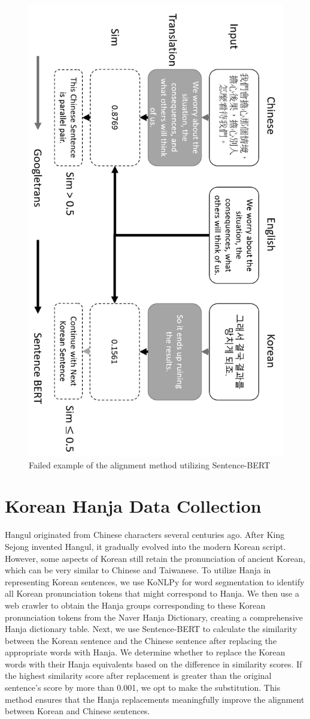 \documentclass[PhD]{PHlab-thesis}
\begin{document}
\begin{figure}[h!]
  \centering
  \includegraphics[width=0.75\linewidth]{fig_3_5.jpg}
  \captionsetup{type=figure}
  \caption{Failed example of the alignment method utilizing Sentence-BERT}
  \label{fig:transcript}
\end{figure}


\section{Korean Hanja Data Collection}
Hangul originated from Chinese characters several centuries ago. After King Sejong invented Hangul, it gradually evolved into the modern Korean script. However, some aspects of Korean still retain the pronunciation of ancient Korean, which can be very similar to Chinese and Taiwanese. To utilize Hanja in representing Korean sentences, we use KoNLPy for word segmentation to identify all Korean pronunciation tokens that might correspond to Hanja. We then use a web crawler to obtain the Hanja groups corresponding to these Korean pronunciation tokens from the Naver Hanja Dictionary, creating a comprehensive Hanja  dictionary table.
Next, we use Sentence-BERT to calculate the similarity between the Korean sentence and the Chinese sentence after replacing the appropriate words with Hanja. We determine whether to replace the Korean words with their Hanja equivalents based on the difference in similarity scores. If the highest similarity score after replacement is greater than the original sentence's score by more than 0.001, we opt to make the substitution. This method ensures that the Hanja replacements meaningfully improve the alignment between Korean and Chinese sentences.
\end{document}
